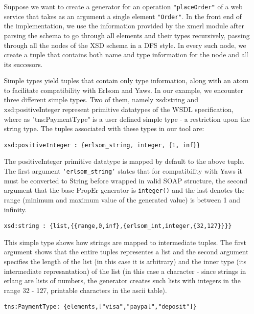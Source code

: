 \documentclass[submission,copyright,a4]{eptcs}
\begin{document}

Suppose we want to create a generator for an operation \texttt{"placeOrder"} of a 
web service that takes as an argument a single element \texttt{"Order"}. In the 
front end of the implementation, we use the information provided by the xmerl 
module after parsing the schema to go through all elements and their types recursively, 
passing through all the nodes of the XSD schema in a DFS style. In every such node, 
we create a tuple that contains both name and type information for the node and 
all its succesors. 

Simple types yield tuples that contain only type information, along with an atom 
to facilitate compatibility with Erlsom and Yaws. In our example, we encounter 
three different simple types. Two of them, namely xsd:string and xsd:positiveInteger 
represent primitive datatypes of the WSDL specification, where as "tns:PaymentType" 
is a user defined simple type - a restriction upon the string type. The tuples 
associated with these types in our tool are:

\begin{lstlisting}
xsd:positiveInteger : {erlsom_string, integer, {1, inf}}
\end{lstlisting}

The positiveInteger primitive datatype is mapped by default to the above tuple. 
The first argument \texttt{'erlsom\_string'} states that for compatibility with 
Yaws it must be converted to String before wrapped in valid SOAP structure, 
the second argument that the base PropEr generator is \texttt{integer()} and the 
last denotes the range (minimum and maximum value of the generated value) is 
between 1 and infinity. 

\begin{lstlisting}
xsd:string : {list,{{range,0,inf},{erlsom_int,integer,{32,127}}}}
\end{lstlisting}

This simple type shows how strings are mapped to intermediate tuples. The first 
argument shows that the entire tuples representes a list and the second argument 
specifies the length of the list (in this case it is arbitrary) and the inner type 
(its intermediate represantation) of the list (in this case a character - since 
strings in erlang are lists of numbers, the generator creates such lists with 
integers in the range 32 - 127, printable characters in the ascii table).

\begin{lstlisting}
tns:PaymentType: {elements,["visa","paypal","deposit"]}
\end{lstlisting}
\end{document}
